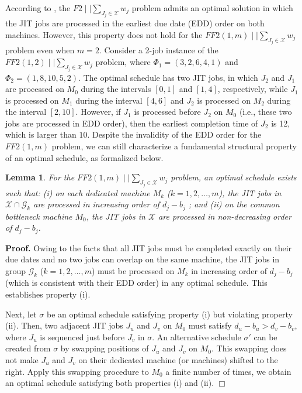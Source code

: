 \documentclass[12pt, eqno, limlimits]{article}
\newtheorem{lemma}{Lemma}[section]
\begin{document}
\begin{sloppypar}
        According to \cite{ChoiYoon2007JOS}, the $F2\mid \mid \sum_{J_j \in \mathcal{X}} w_j$ problem admits an optimal solution in which the JIT jobs are processed in the earliest due date (EDD) order on both machines. However, this property does not hold for the $FF2(1, m)\mid \mid \sum_{J_j \in \mathcal{X}} w_j$ problem even when $m=2$. Consider a 2-job instance of the $FF2(1, 2)\mid \mid \sum_{J_j \in \mathcal{X}} w_j$ problem, where $\Phi_1=(3, 2, 6, 4, 1)$ and $\Phi_2=(1, 8, 10, 5, 2)$. The optimal schedule has two JIT jobs, in which $J_2$ and $J_1$ are processed on $M_0$ during the intervals $[0,1]$ and $[1, 4]$, respectively, while $J_1$ is processed on $M_1$ during the interval $[4,6]$ and $J_2$ is processed  on $M_2$ during the interval $[2,10]$. However, if $J_1$ is processed before $J_2$ on $M_0$  (i.e., these two jobs are processed in EDD order), then the earliest completion time of $J_2$ is 12, which is larger than $10$.  Despite the invalidity of the EDD order for the $FF2(1, m)$ problem, we can still characterize a fundamental structural property of an optimal schedule, as formalized below. 
        
        \begin{lemma} \label{L-3.2}
            For the $FF2(1, m)\mid \mid \sum_{J_j \in \mathcal{X}} w_j$ problem, an optimal schedule exists such that: (i) on each dedicated machine $M_k$ ($k=1, 2, \ldots, m$), the JIT jobs in $\mathcal{X} \cap \mathcal{G}_k$ are processed in increasing order of $d_j-b_j$ ; and (ii) on the common bottleneck machine $M_0$, the JIT jobs in $\mathcal{X}$ are processed in non-decreasing order of $d_j-b_j$.
        \end{lemma}
        
        \noindent \textbf{Proof.} Owing to the facts that all JIT jobs must be completed exactly on their due dates and no two jobs can overlap on the same machine, the JIT jobs in group $\mathcal{G}_k$ ($k=1, 2, \ldots, m$) must be processed on $M_k$ in increasing order of $d_j-b_j$ (which is consistent with their EDD order) in any optimal schedule. This establishes property (i).
        
        Next, let $\sigma$ be an optimal schedule satisfying property (i) but violating property (ii).
        Then, two adjacent JIT jobs $J_u$ and $J_v$ on $M_0$ must satisfy $d_u-b_u > d_v-b_v$, where $J_u$ is sequenced just before $J_v$ in $\sigma$. An alternative schedule $\sigma'$ can be created from $\sigma$ by swapping positions of $J_u$ and $J_v$ on $M_0$. This swapping does not make $J_u$ and $J_v$ on their dedicated machine (or machines) shifted to the right. Apply this swapping procedure to $M_0$ a finite number of times, we obtain an optimal schedule satisfying both properties (i) and (ii). \hfill$\Box$\\
        

\end{sloppypar}
\end{document}
